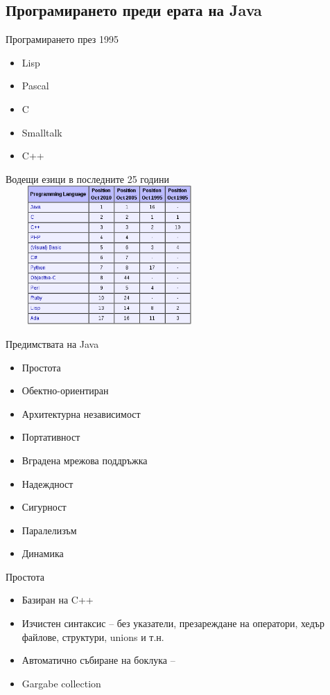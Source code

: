 \documentclass{beamer}
\begin{document}
\subsection{Програмирането преди ерата на Java}

\begin{frame}{Програмирането през 1995}
  \begin{itemize}
    \item Lisp
    \item Pascal
    \item C
    \item Smalltalk
    \item C++
  \end{itemize}
\end{frame}

\begin{frame}{Водещи езици в последните 25 години}
  \includegraphics[width=300px,
  height=200px]{images/lang-history}
\end{frame}


\begin{frame}{Предимствата на Java}
  \begin{itemize}
  \item Простота
  \item Обектно-ориентиран
  \item Архитектурна независимост
  \item Портативност
  \item Вградена мрежова поддръжка
  \item Надеждност
  \item Сигурност
  \item Паралелизъм
  \item Динамика
  \end{itemize}
\end{frame}


\begin{frame}{Простота}
  
  \begin{itemize}
    \item Базиран на C++
    \item Изчистен синтаксис – без указатели,
    презареждане на оператори, хедър
    файлове, структури, unions и т.н.
    \item Автоматично събиране на боклука –
    \item Gargabe collection
    
  \end{itemize}
\end{frame}
\end{document}
